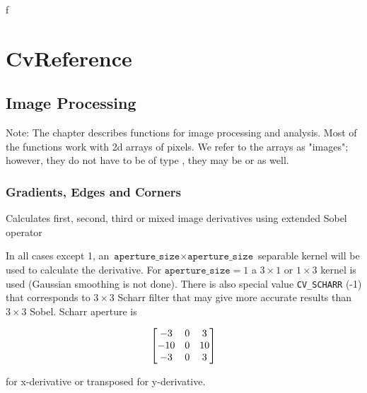 f\chapter{CvReference}
\section{Image Processing}

Note: The chapter describes functions for image processing and
analysis. Most of the functions work with 2d arrays of pixels. We refer
to the arrays as "images"; however, they do not have to be of type
, they may be  or  as well.

\subsection{Gradients, Edges and Corners}

\label{Sobel}
\label{Sobel}
Calculates first, second, third or mixed image derivatives using extended Sobel operator

\begin{description}
\end{description}

In all cases except 1, an $\texttt{aperture\_size} \times
\texttt{aperture\_size}$ separable kernel will be used to calculate the
derivative. For $\texttt{aperture\_size} = 1$ a $ 3 \times 1$ or $ 1 \times 3$
kernel is used (Gaussian smoothing is not done). There is also special
value \texttt{CV\_SCHARR} (-1) that corresponds to $3\times3$ Scharr
filter that may give more accurate results than $3\times3$ Sobel. Scharr
aperture is

\[ \begin{bmatrix} -3 & 0 & 3\\ -10 & 0 & 10\\ -3 & 0 & 3 \end{bmatrix}
\]

for x-derivative or transposed for y-derivative.

